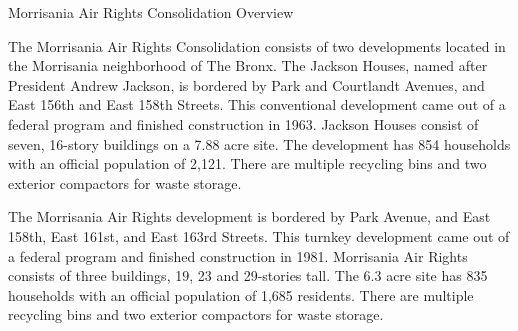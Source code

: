 Morrisania Air Rights Consolidation Overview

The Morrisania Air Rights Consolidation consists of two developments located in the Morrisania neighborhood of The Bronx. The Jackson Houses, named after President Andrew Jackson, is bordered by Park and Courtlandt Avenues, and East 156th and East 158th Streets. This conventional development came out of a federal program and finished construction in 1963. Jackson Houses consist of seven, 16-story buildings on a 7.88 acre site. The development has 854 households with an official population of 2,121. There are multiple recycling bins and two exterior compactors for waste storage.

The Morrisania Air Rights development is bordered by Park Avenue, and East 158th, East 161st, and East 163rd Streets. This turnkey development came out of a federal program and finished construction in 1981. Morrisania Air Rights consists of three buildings, 19, 23 and 29-stories tall. The 6.3 acre site has 835 households with an official population of 1,685 residents. There are multiple recycling bins and two exterior compactors for waste storage.